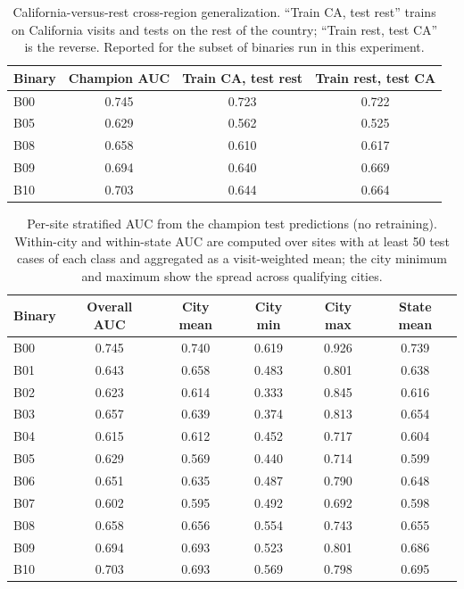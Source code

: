 \documentclass[utf8]{frontiers_suppmat} %
\begin{document}
\begin{table}[t]
\centering
\caption{California-versus-rest cross-region generalization. ``Train CA,
test rest'' trains on California visits and tests on the rest of the
country; ``Train rest, test CA'' is the reverse. Reported for the
subset of binaries run in this experiment.}
\label{tab:supp-location-state}
\footnotesize
\setlength{\tabcolsep}{6pt}
\renewcommand{\arraystretch}{1.15}
\begin{tabular}{@{}l c c c@{}}
\toprule
Binary & Champion AUC & Train CA, test rest & Train rest, test CA \\
\midrule
B00 & 0.745 & 0.723 & 0.722 \\
B05 & 0.629 & 0.562 & 0.525 \\
B08 & 0.658 & 0.610 & 0.617 \\
B09 & 0.694 & 0.640 & 0.669 \\
B10 & 0.703 & 0.644 & 0.664 \\
\bottomrule
\end{tabular}
\end{table}

\begin{table}[t]
\centering
\caption{Per-site stratified AUC from the champion test predictions (no
retraining). Within-city and within-state AUC are computed over sites
with at least 50 test cases of each class and aggregated as a
visit-weighted mean; the city minimum and maximum show the spread
across qualifying cities.}
\label{tab:supp-location-site}
\footnotesize
\setlength{\tabcolsep}{5pt}
\renewcommand{\arraystretch}{1.15}
\begin{tabular}{@{}l c c c c c@{}}
\toprule
Binary & Overall AUC & City mean & City min & City max & State mean \\
\midrule
B00 & 0.745 & 0.740 & 0.619 & 0.926 & 0.739 \\
B01 & 0.643 & 0.658 & 0.483 & 0.801 & 0.638 \\
B02 & 0.623 & 0.614 & 0.333 & 0.845 & 0.616 \\
B03 & 0.657 & 0.639 & 0.374 & 0.813 & 0.654 \\
B04 & 0.615 & 0.612 & 0.452 & 0.717 & 0.604 \\
B05 & 0.629 & 0.569 & 0.440 & 0.714 & 0.599 \\
B06 & 0.651 & 0.635 & 0.487 & 0.790 & 0.648 \\
B07 & 0.602 & 0.595 & 0.492 & 0.692 & 0.598 \\
B08 & 0.658 & 0.656 & 0.554 & 0.743 & 0.655 \\
B09 & 0.694 & 0.693 & 0.523 & 0.801 & 0.686 \\
B10 & 0.703 & 0.693 & 0.569 & 0.798 & 0.695 \\
\bottomrule
\end{tabular}
\end{table}
\end{document}
